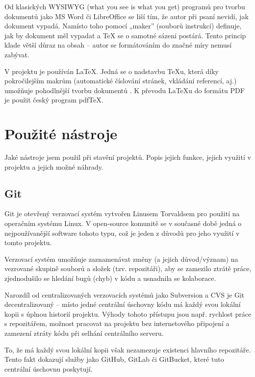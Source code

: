 \documentclass[a4paper, 12pt]{article}
\begin{document}
  Od klasických WYSIWYG (what you see is what you get) programů pro tvorbu dokumentů jako MS Word či LibreOffice se liší tím, že autor při psaní nevidí, jak dokument vypadá. Namísto toho pomocí „maker” (souborů instrukcí) definuje, jak by dokument měl vypadat a \TeX{} se o samotné sázení postárá. Tento princip klade větší důraz na obsah -- autor se formátováním do značné míry nemusí zabývat.

  V projektu je používán \LaTeX. Jedná se o nadstavbu \TeX u, která díky pokročilejším makrům (automatické číslování stránek, vkládání referencí, aj.) umožňuje pohodlnější tvorbu dokumentů \cite{getting-started-with-latex}. K převodu \LaTeX u do formátu PDF je použit český program pdf\TeX{}\cite{pdftex}.


  \section{Použité nástroje} \label{sec:Použité nástroje}
  Jaké nástroje jsem použil při stavění projektů.
  Popis jejich funkce, jejich využití v projektu a jejich možné náhrady.

  \subsection{Git} \label{sec:Git}
  Git je otevřený\cite{git-source} verzovací systém vytvořen Linusem Torvaldsem pro použití na operačním systému Linux. V open-source komunitě se v současné době jedná o nejpoužívanější software tohoto typu\cite{version-control-usage-statistics}, což je jeden z důvodů pro jeho využití v tomto projektu.

  Verzovací systém umožňuje zaznamenávat změny (a jejich důvod/význam) na vezrované skupině souborů a složek (tzv. repozitáři), aby se zamezilo ztrátě práce, zjednodušilo se hledání bugů (chyb) v kódu a usnadnila se kolaborace.

  Narozdíl od centralizovaných verzovacích systémů jako Subversion a CVS je Git decentralizovaný -- místo jedné centrální úschovny kódu má každý svou lokální kopii s úplnou historií projektu. Výhody tohoto přístupu jsou např. rychlost práce s repozitářem, možnost pracovat na projektu bez internetového připojení a zamezení ztráty kódu při selhání centrálního serveru\cite{cvcs-vs-dvcs}.

  To, že má každý svou lokální kopii však nezamezuje existenci hlavního repozitáře. Tento fakt dokazují služby jako GitHub, GitLab či GitBucket, které tuto centrální úschovnu poskytují.
\end{document}
